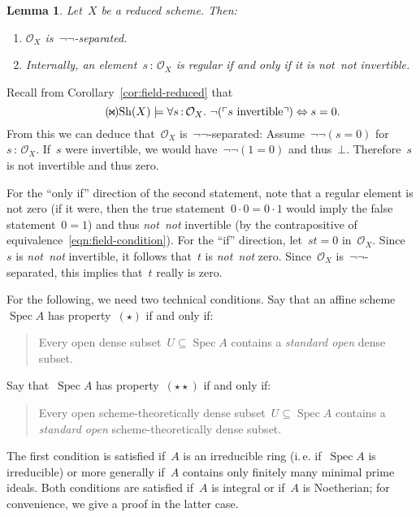 \documentclass[10pt,reqno,a4paper]{amsbook}
\makeatletter
\theoremstyle{definition}
\theoremstyle{plain}
\newtheorem{lemma}[defn]{Lemma}
\theoremstyle{remark}
\renewcommand{\O}{\mathcal{O}}
\newcommand{\Sh}{\mathrm{Sh}}
\DeclareMathOperator{\Spec}{Spec}
\newcommand{\?}{\,{:}\,}
\renewcommand{\_}{\mathpunct{.}\,}
\newcommand{\speak}[1]{\ulcorner\text{\textnormal{#1}}\urcorner}
\newcommand{\ie}{i.\,e.\@\xspace}
\newcommand{\notnot}{\emph{not~not}\xspace}
\renewenvironment{proof}[1][\proofname]{\par
  \pushQED{\qed}%
  \normalfont \topsep6\p@\@plus6\p@\relax
  \trivlist
  \item[\hskip\labelsep
        \itshape
    #1\@addpunct{.}]\ignorespaces
}{%
  \popQED\endtrivlist\@endpefalse
}
\makeatother
\begin{document}
\begin{lemma}\label{lemma:regular-notnot-invertible}Let~$X$ be a reduced scheme. Then:
\begin{enumerate}
\item $\O_X$ is~$\neg\neg$-separated.
\item Internally, an element~$s\?\O_X$ is regular
if and only if it is \notnot invertible.
\end{enumerate}
\end{lemma}
\begin{proof}Recall from Corollary~\ref{cor:field-reduced} that
\begin{equation}\label{eqn:field-condition}\tag{${\!\Join\!}$}
  \Sh(X) \models \forall s\?\O_X\_ \neg(\speak{$s$ invertible}) \Leftrightarrow
  s=0.
\end{equation}
From this we can deduce that~$\O_X$ is~$\neg\neg$-separated:
Assume~$\neg\neg(s=0)$ for~$s\?\O_X$. If~$s$ were invertible, we would
have~$\neg\neg(1=0)$ and thus~$\bot$. Therefore~$s$ is not invertible and thus
zero.

For the ``only if'' direction of the second statement,
note that a regular element is not zero (if it were, then the true statement~$0
\cdot 0 = 0 \cdot 1$ would imply the false statement~$0 = 1$) and thus \notnot
invertible (by the contrapositive of equivalence~\eqref{eqn:field-condition}). For the ``if''
direction, let~$st = 0$ in~$\O_X$. Since~$s$ is \notnot invertible, it follows
that~$t$ is \notnot zero. Since~$\O_X$ is~$\neg\neg$-separated, this implies
that~$t$ really is zero.
\end{proof}

For the following, we need two technical conditions. Say that an affine
scheme~$\Spec A$ has property~$(\star)$ if and only if:
\begin{quote}
Every open dense subset~$U \subseteq \Spec A$ contains a
\emph{standard open} dense subset.
\end{quote}
Say that~$\Spec A$ has property~$(\star\star)$ if and only if:
\begin{quote}
Every open scheme-theoretically dense subset~$U \subseteq \Spec A$ contains a
\emph{standard open} scheme-theoretically dense subset.
\end{quote}
The first condition is satisfied if~$A$ is an irreducible ring (\ie if~$\Spec A$
is irreducible) or more generally if~$A$ contains only finitely many minimal
prime ideals. Both conditions are satisfied if~$A$ is integral or if~$A$ is
Noetherian; for convenience, we give a proof in the
latter case.
\end{document}
